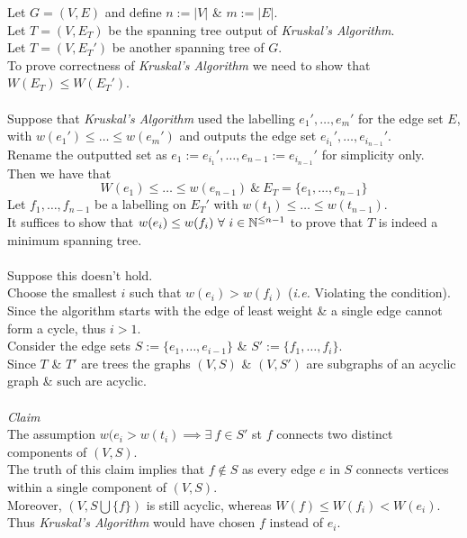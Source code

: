 \documentclass[11pt,a4paper]{article}
\begin{document}
Let $G=(V,E)$ and define $n:=|V|$ \& $m:=|E|$.\\
Let $T=(V,E_T)$ be the spanning tree output of \textit{Kruskal's Algorithm}.\\
Let $T=(V,E_T')$ be another spanning tree of $G$.\\
To prove correctness of \textit{Kruskal's Algorithm} we need to show that $W(E_T)\leq W(E_T')$.\\
\\
Suppose that \textit{Kruskal's Algorithm} used the labelling $e_1',\dots,e_m'$ for the edge set $E$, with $w(e_1')\leq\dots\leq w(e_m')$ and outputs the edge set $e_{i_1}',\dots,e_{i_{n-1}}'$.\\
Rename the outputted set as $e_1:=e_{i_1}',\dots,e_{n-1}:=e_{i_{n-1}}'$ for simplicity only.\\
Then we have that
$$W(e_1)\leq\dots\leq w(e_{n-1})\ \&\ E_T=\{e_1,\dots,e_{n-1}\}$$
Let $f_1,\dots,f_{n-1}$ be a labelling on $E_T'$ with $w(t_1)\leq\dots\leq w(t_{n-1})$.\\
It suffices to show that $w(e_i)\leq w(f_i)\ \forall\ i\in\nats^{\leq n-1}$ to prove that $T$ is indeed a minimum spanning tree.\\
\\
Suppose this doesn't hold.\\
Choose the smallest $i$ such that $w(e_i)>w(f_i)$ (\textit{i.e.} Violating the condition).\\
Since the algorithm starts with the edge of least weight \& a single edge cannot form a cycle, thus $i>1$.\\
Consider the edge sets $S:=\{e_1,\dots,e_{i-1}\}$ \& $S':=\{f_1,\dots,f_i\}$.\\
Since $T$ \& $T'$ are trees the graphs $(V,S)$ \& $(V,S')$ are subgraphs of an acyclic graph \& such are acyclic.\\
\\
\textit{Claim}\\
The assumption $w(e_i>w(t_i)\implies\exists\ f\in S'$ st $f$ connects two distinct components of $(V,S)$.\\
The truth of this claim implies that $f\not\in S$ as every edge $e$ in $S$ connects vertices within a single component of $(V,S)$.\\
Moreover, $\left(V,S\bigcup\{f\}\right)$ is still acyclic, whereas $W(f)\leq W(f_i)<W(e_i)$.\\
Thus \textit{Kruskal's Algorithm} would have chosen $f$ instead of $e_i$.\\
\end{document}

